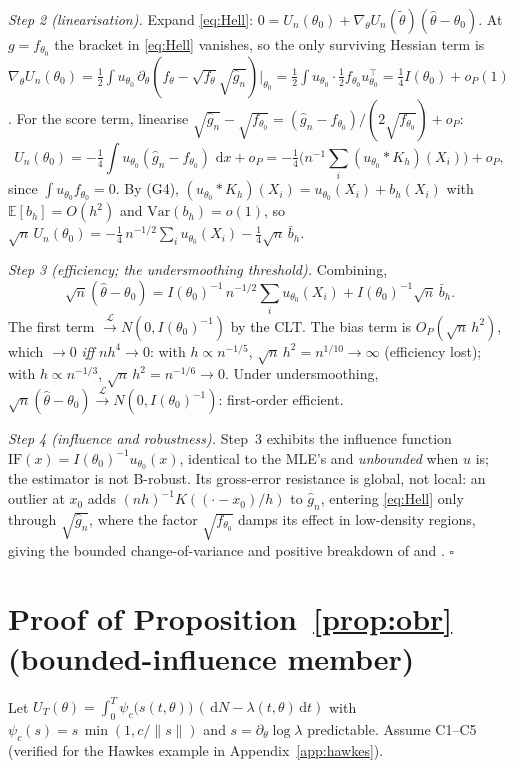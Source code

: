 \documentclass[smallextended,natbib]{svjour3}
\newcommand{\dd}{\,\mathrm{d}}
\newcommand{\E}{\mathbb{E}}
\newcommand{\toL}{\xrightarrow{\mathcal{L}}}
\begin{document}
\emph{Step 2 (linearisation).} Expand \eqref{eq:Hell}: $0=U_n(\theta_0)+\nabla_\theta U_n(\tilde\theta)(\hat\theta-\theta_0)$.
At $g=f_{\theta_0}$ the bracket in \eqref{eq:Hell} vanishes, so the only surviving
Hessian term is
$\nabla_\theta U_n(\theta_0)=\tfrac12\!\int u_{\theta_0}\,\partial_\theta(f_\theta-\sqrt{f_\theta}\sqrt{\hat g_n})|_{\theta_0}
=\tfrac12\!\int u_{\theta_0}\cdot\tfrac12 f_{\theta_0}u_{\theta_0}^\top=\tfrac14 I(\theta_0)+o_P(1)$.
For the score term, linearise $\sqrt{\hat g_n}-\sqrt{f_{\theta_0}}=(\hat g_n-f_{\theta_0})/(2\sqrt{f_{\theta_0}})+o_P$:
\[
U_n(\theta_0)=-\tfrac14\!\int u_{\theta_0}(\hat g_n-f_{\theta_0})\,\dd x+o_P
=-\tfrac14\Big(n^{-1}\!\sum_i(u_{\theta_0}*K_h)(X_i)\Big)+o_P,
\]
since $\int u_{\theta_0}f_{\theta_0}=0$. By (G4), $(u_{\theta_0}*K_h)(X_i)=u_{\theta_0}(X_i)+b_h(X_i)$
with $\E[b_h]=O(h^2)$ and $\mathrm{Var}(b_h)=o(1)$, so
$\sqrt n\,U_n(\theta_0)=-\tfrac14\,n^{-1/2}\sum_i u_{\theta_0}(X_i)-\tfrac14\sqrt n\,\bar b_h$.

\emph{Step 3 (efficiency; the undersmoothing threshold).} Combining,
\[
\sqrt n(\hat\theta-\theta_0)=I(\theta_0)^{-1}\,n^{-1/2}\!\sum_i u_{\theta_0}(X_i)
+I(\theta_0)^{-1}\sqrt n\,\bar b_h.
\]
The first term $\toL N(0,I(\theta_0)^{-1})$ by the CLT. The bias term is
$O_P(\sqrt n\,h^2)$, which $\to0$ \emph{iff} $nh^4\to0$: with $h\propto n^{-1/5}$,
$\sqrt n\,h^2=n^{1/10}\to\infty$ (efficiency lost); with $h\propto n^{-1/3}$,
$\sqrt n\,h^2=n^{-1/6}\to0$. Under undersmoothing,
$\sqrt n(\hat\theta-\theta_0)\toL N(0,I(\theta_0)^{-1})$: first-order efficient.

\emph{Step 4 (influence and robustness).} Step~3 exhibits the influence function
$\mathrm{IF}(x)=I(\theta_0)^{-1}u_{\theta_0}(x)$, identical to the MLE's and
\emph{unbounded} when $u$ is; the estimator is not B-robust. Its gross-error
resistance is global, not local: an outlier at $x_0$ adds $(nh)^{-1}K((\cdot-x_0)/h)$
to $\hat g_n$, entering \eqref{eq:Hell} only through $\sqrt{\hat g_n}$, where the
factor $\sqrt{f_{\theta_0}}$ damps its effect in low-density regions, giving the
bounded change-of-variance and positive breakdown of \citet{beran1977} and
\citet{lindsay1994}. \hfill$\square$

\section{Proof of Proposition~\ref{prop:obr} (bounded-influence member)}
\label{app:obr}
Let $U_T(\theta)=\int_0^T\psi_c\big(s(t,\theta)\big)\,(\dd N-\lambda(t,\theta)\dd t)$ with
$\psi_c(s)=s\,\min(1,c/\|s\|)$ and $s=\partial_\theta\log\lambda$ predictable. Assume
C1--C5 (verified for the Hawkes example in Appendix~\ref{app:hawkes}).
\end{document}
